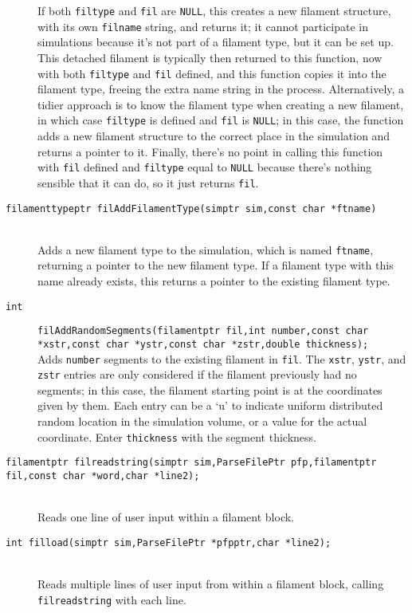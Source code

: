 \documentclass {scrbook}
\newcommand {\ttt} {\texttt}
\begin{document}
\begin{description}
If both \ttt{filtype} and \ttt{fil} are \ttt{NULL}, this creates a new filament structure, with its own \ttt{filname} string, and returns it; it cannot participate in simulations because it's not part of a filament type, but it can be set up. This detached filament is typically then returned to this function, now with both \ttt{filtype} and \ttt{fil} defined, and this function copies it into the filament type, freeing the extra name string in the process. Alternatively, a tidier approach is to know the filament type when creating a new filament, in which case \ttt{filtype} is defined and \ttt{fil} is \ttt{NULL}; in this case, the function adds a new filament structure to the correct place in the simulation and returns a pointer to it. Finally, there's no point in calling this function with \ttt{fil} defined and \ttt{filtype} equal to \ttt{NULL} because there's nothing sensible that it can do, so it just returns \ttt{fil}.

\item[\ttt{filamenttypeptr filAddFilamentType(simptr sim,const char *ftname)}]
\hfill \\
Adds a new filament type to the simulation, which is named \ttt{ftname}, returning a pointer to the new filament type. If a filament type with this name already exists, this returns a pointer to the existing filament type.

\item[\ttt{int}]
\ttt{filAddRandomSegments(filamentptr fil,int number,const char *xstr,const char *ystr,const char *zstr,double thickness);}
\hfill \\
Adds \ttt{number} segments to the existing filament in \ttt{fil}. The \ttt{xstr}, \ttt{ystr}, and \ttt{zstr} entries are only considered if the filament previously had no segments; in this case, the filament starting point is at the coordinates given by them. Each entry can be a `u' to indicate uniform distributed random location in the simulation volume, or a value for the actual coordinate. Enter \ttt{thickness} with the segment thickness.

\item[\ttt{filamentptr filreadstring(simptr sim,ParseFilePtr pfp,filamentptr fil,const char *word,char *line2);}]
\hfill \\
Reads one line of user input within a filament block.

\item[\ttt{int filload(simptr sim,ParseFilePtr *pfpptr,char *line2);}]
\hfill \\
Reads multiple lines of user input from within a filament block, calling \ttt{filreadstring} with each line.


\end{description}
\end{document}
